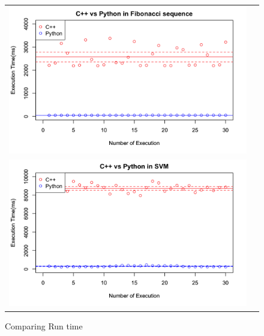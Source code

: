 \documentclass[11pt, a4paper]{article}
\begin{document}
\begin{figure}[htbp]
	\begin{tabular}{cc}
      \begin{minipage}[t]{0.45\hsize}
        \centering
        \includegraphics[clip, width=170mm]{00002d.png}
      \end{minipage}\\
      \begin{minipage}[t]{0.45\hsize}
        \centering
        \includegraphics[clip, width=170mm]{000017.png}
      \end{minipage}
    \end{tabular}
    \caption{Comparing Run time}
\end{figure}
\end{document}
